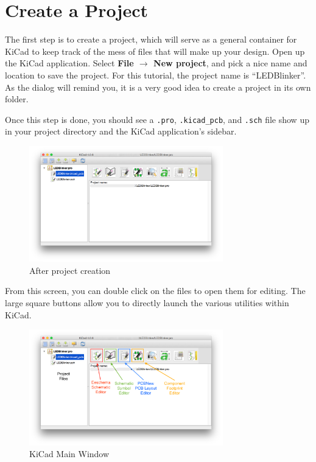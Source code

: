 \documentclass[12pt, oneside]{article}
\begin{document}
\section{Create a Project}
The first step is to create a project, which will serve as a general container for KiCad to keep track of the mess of files that will make up your design. Open up the KiCad application. Select \textbf{File $\rightarrow$ New project}, and pick a nice name and location to save the project. For this tutorial, the project name is ``LEDBlinker''. As the dialog will remind you, it is a very good idea to create a project in its own folder. 

Once this step is done, you should see a \texttt{.pro}, \texttt{.kicad\_pcb}, and \texttt{.sch} file show up in your project directory and the KiCad application's sidebar.

\begin{figure}[H]
\includegraphics[width=0.75\textwidth]{CreateProject}
\centering
\caption{After project creation}
\end{figure}

From this screen, you can double click on the files to open them for editing. The large square buttons allow you to directly launch the various utilities within KiCad.

\begin{figure}[H]
\includegraphics[width=0.75\textwidth]{CreateProject_annotated}
\centering
\caption{KiCad Main Window}
\end{figure}
\end{document}
